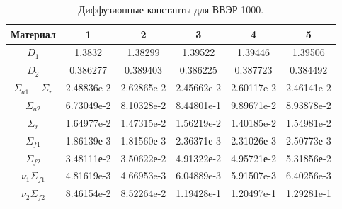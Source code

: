 \begin{table}[H]
\caption{\label{tab:canonsummary}Диффузионные константы для ВВЭР-1000.}
\label{t6}
\begin{center}
\begin{tabular}{|c|c|c|c|c|c|}
\hline
Материал & 1 & 2 & 3 & 4 & 5\\
\hline 
$D_1$ & 1.3832 & 1.38299 & 1.39522 & 1.39446 & 1.39506\\
\hline 
$D_2$ & 0.386277 & 0.389403 & 0.386225 & 0.387723 & 0.384492\\
\hline 
$\Sigma_{a1} + \Sigma_r$ & 2.48836e-2 & 2.62865e-2 & 2.45662e-2 & 2.60117e-2 & 2.46141e-2\\
\hline
$\Sigma_{a2}$ & 6.73049e-2 & 8.10328e-2 & 8.44801e-1 & 9.89671e-2 & 8.93878e-2\\
\hline
$\Sigma_r$ & 1.64977e-2 & 1.47315e-2 & 1.56219e-2 & 1.40185e-2 & 1.54981e-2\\
\hline
$\Sigma_{f1}$ & 1.86139е-3 & 1.81560е-3 & 2.36371е-3 & 2.31026е-3 & 2.50773е-3\\
\hline
$\Sigma_{f2}$ & 3.48111е-2 & 3.50622е-2 & 4.91322е-2 & 4.95721е-2 & 5.31856е-2\\
\hline
$\nu_1\Sigma_{f1}$ & 4.81619e-3 & 4.66953e-3 & 6.04889e-3 & 5.91507e-3 & 6.40256e-3\\
\hline
$\nu_2\Sigma_{f2}$ & 8.46154e-2 & 8.52264e-2 & 1.19428e-1 & 1.20497e-1 & 1.29281e-1\\
\hline
\end{tabular}
\end{center}
\end{table}

